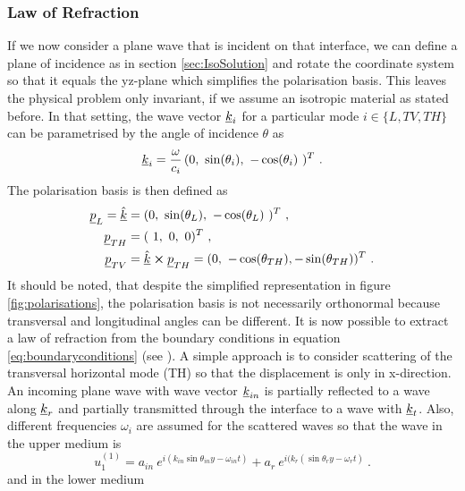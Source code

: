 \subsubsection{Law of Refraction} \label{sec:lawofrefr}
If we now consider a plane wave
that is incident on that interface, we can define a plane of incidence as in
section \ref{sec:IsoSolution} and rotate the
coordinate system so that it equals the yz-plane which simplifies the
polarisation basis. This leaves the physical problem only invariant, if we
assume an isotropic material as stated before.
In that setting, the wave vector $\underline{k}_i$ for a particular mode $i \in
    \{L,TV,TH\}$ can be parametrised by the angle of incidence $\theta$ as
\begin{equation} \label{eq:k_fromangle}
    \uline{k}_i = \frac{\omega}{c_i}\, ( 0,\ \sin(\theta_i),\ -\cos(\theta_i)\
    )^T \ .
\end{equation}
The polarisation basis is then defined as
\begin{align}
    \uline{p}_L = \uline{\hat{k}} & = ( 0,\ \sin(\theta_L),\ -\cos(\theta_L)\
    )^T \ ,
    \\
    \uline{p}_{TH}                & = (\ 1,\ 0,\ 0)^T \ ,
    \\
    \uline{p}_{TV}                & = \uline{\hat{k}} \cross \uline{p}_{TH}
    = ( 0,\ -\cos(\theta_{TH}), -\sin(\theta_{TH}))^T \ .
\end{align}
It should be noted, that despite the simplified representation in figure 
\ref{fig:polarisations}, the polarisation basis is not necessarily orthonormal
because transversal and longitudinal angles can be different.
It is now possible to extract a law of refraction from the boundary conditions
in equation \ref{eq:boundaryconditions} (see \cite[168ff]{achenbach1973wave}).
A simple approach is to consider
scattering of the transversal horizontal mode (TH) so that the displacement is
only in x-direction. An incoming plane wave with
wave vector $\underline{k}_{in}$ is partially reflected to a wave along
$\underline{k}_r$ and partially transmitted through the interface to a wave with
$\underline{k}_t$. Also, different frequencies $\omega_i$ are assumed for the
scattered waves so that the wave in the upper medium is
\begin{equation}
    u_1^{(1)} = a_{in}\
    e^{i( k_{in}\sin\theta_{in} y-\omega_{in} t)}
    + a_r\ e^{i( k_{r}(\sin\theta_{r} y -\omega_{r} t)} \ .
\end{equation}
and in the lower medium
